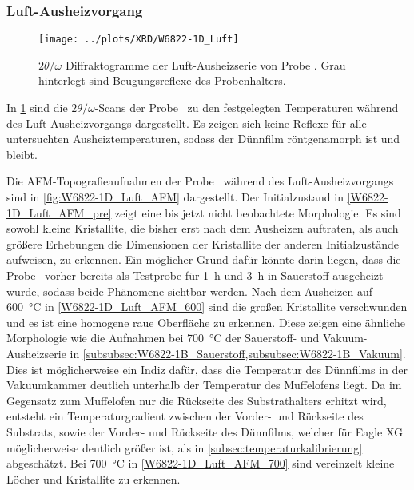 \subsubsection{Luft-Ausheizvorgang}\label{subsubsec:W6822-1B_Luft}
\begin{figure}
    \centering
    \texttt{[image: ../plots/XRD/W6822-1D\_Luft]}
    \caption{$2\theta/\omega$ Diffraktogramme der Luft-Ausheizserie von Probe \sampletwo.
    Grau hinterlegt sind Beugungsreflexe des Probenhalters.}
    \label{fig:W6822-1D_Luft_XRD}
\end{figure}

In \cref{fig:W6822-1D_Luft_XRD} sind die $2\theta/\omega$-Scans der Probe \sampletwo\ zu den festgelegten Temperaturen
während des Luft-Ausheizvorgangs dargestellt.
Es zeigen sich keine Reflexe für alle untersuchten Ausheiztemperaturen, sodass der Dünnfilm röntgenamorph
ist und bleibt.

Die AFM-Topografieaufnahmen der Probe \sampletwo\ während des Luft-Ausheizvorgangs sind in \cref{fig:W6822-1D_Luft_AFM}
dargestellt.
Der Initialzustand in \cref{W6822-1D_Luft_AFM_pre} zeigt eine bis jetzt nicht beobachtete Morphologie.
Es sind sowohl kleine Kristallite, die bisher erst nach dem Ausheizen auftraten, als auch größere Erhebungen die
Dimensionen der Kristallite der anderen Initialzustände aufweisen, zu erkennen.
Ein möglicher Grund dafür könnte darin liegen, dass die Probe \sampletwo\ vorher bereits als Testprobe für \qty{1}{\hour} und
\qty{3}{\hour} in Sauerstoff ausgeheizt wurde, sodass beide Phänomene sichtbar werden.
Nach dem Ausheizen auf \qty{600}{\degreeCelsius} in \cref{W6822-1D_Luft_AFM_600} sind die großen Kristallite
verschwunden und es ist eine homogene raue Oberfläche zu erkennen.
Diese zeigen eine ähnliche Morphologie wie die Aufnahmen bei \qty{700}{\degreeCelsius} der Sauerstoff- und
Vakuum-Ausheizserie in \cref{subsubsec:W6822-1B_Sauerstoff,subsubsec:W6822-1B_Vakuum}.
Dies ist möglicherweise ein Indiz dafür, dass die Temperatur des Dünnfilms in der Vakuumkammer deutlich
unterhalb der Temperatur des Muffelofens liegt.
Da im Gegensatz zum Muffelofen nur die Rückseite des Substrathalters erhitzt wird, entsteht
ein Temperaturgradient zwischen der Vorder- und Rückseite des Substrats, sowie der Vorder- und
Rückseite des Dünnfilms, welcher für Eagle XG möglicherweise deutlich größer ist, als in
\cref{subsec:temperaturkalibrierung} abgeschätzt.
Bei \qty{700}{\degreeCelsius} in \cref{W6822-1D_Luft_AFM_700} sind vereinzelt kleine Löcher und Kristallite zu
erkennen.



